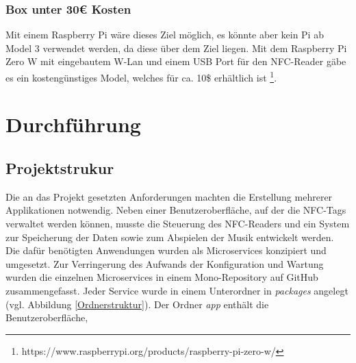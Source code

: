 \documentclass[10pt, a4paper]{article}
\begin{document}
\subsubsection{Box unter 30€ Kosten}
Mit einem Raspberry Pi wäre dieses Ziel möglich, es könnte aber kein Pi ab Model 3 verwendet werden, da diese über dem Ziel liegen.
Mit dem Raspberry Pi Zero W mit eingebautem W-Lan und einem USB Port für den NFC-Reader gäbe es ein kostengünstiges Model, welches für ca. 10\$ erhältlich ist \footnote{https://www.raspberrypi.org/products/raspberry-pi-zero-w/}.


\section{Durchführung}

\subsection{Projektstrukur}
\label{Ordnerstruktur}
Die an das Projekt gesetzten Anforderungen machten die Erstellung mehrerer Applikationen notwendig. Neben einer Benutzeroberfläche, auf der die NFC-Tags
verwaltet werden können, musste die Steuerung des NFC-Readers und ein System zur Speicherung der Daten sowie zum Abspielen der Musik entwickelt werden.
Die dafür benötigten Anwendungen wurden als Microservices konzipiert und umgesetzt. Zur Verringerung des Aufwands der Konfiguration und Wartung wurden die einzelnen Microservices in einem Mono-Repository auf GitHub zusammengefasst.
Jeder Service wurde in einem Unterordner in \textit{packages} angelegt (vgl. Abbildung \ref*{Ordnerstruktur}). Der Ordner \textit{app} enthält die Benutzeroberfläche,
\end{document}
